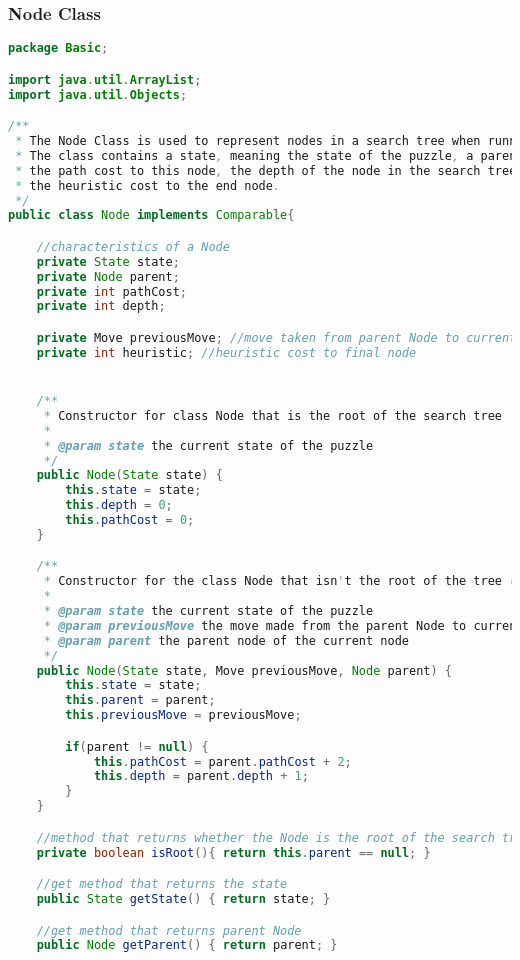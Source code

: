 \documentclass[a4paper, 11pt]{article} %
\begin{document}
\subsubsection{Node Class}
\begin{lstlisting}[language=java]
package Basic;

import java.util.ArrayList;
import java.util.Objects;

/**
 * The Node Class is used to represent nodes in a search tree when running the different algorithms.
 * The class contains a state, meaning the state of the puzzle, a parent meaning the previous node,
 * the path cost to this node, the depth of the node in the search tree, the previous move taken and
 * the heuristic cost to the end node.
 */
public class Node implements Comparable{

    //characteristics of a Node
    private State state;
    private Node parent;
    private int pathCost;
    private int depth;

    private Move previousMove; //move taken from parent Node to current Node
    private int heuristic; //heuristic cost to final node


    /**
     * Constructor for class Node that is the root of the search tree
     *
     * @param state the current state of the puzzle
     */
    public Node(State state) {
        this.state = state;
        this.depth = 0;
        this.pathCost = 0;
    }

    /**
     * Constructor for the class Node that isn't the root of the tree (has parent node)
     *
     * @param state the current state of the puzzle
     * @param previousMove the move made from the parent Node to current Node
     * @param parent the parent node of the current node
     */
    public Node(State state, Move previousMove, Node parent) {
        this.state = state;
        this.parent = parent;
        this.previousMove = previousMove;

        if(parent != null) {
            this.pathCost = parent.pathCost + 2;
            this.depth = parent.depth + 1;
        }
    }

    //method that returns whether the Node is the root of the search tree
    private boolean isRoot(){ return this.parent == null; }

    //get method that returns the state
    public State getState() { return state; }

    //get method that returns parent Node
    public Node getParent() { return parent; }


\end{lstlisting}
\end{document}

